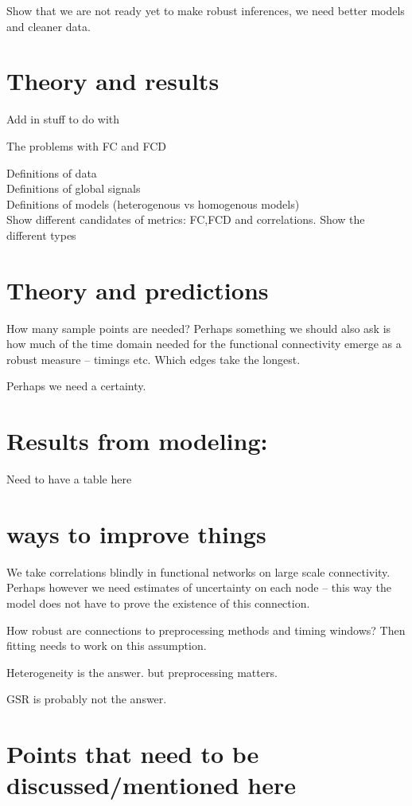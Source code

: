 \documentclass[10pt]{article}
\begin{document}
Show that we are not ready yet to make robust inferences, we need better models and cleaner data.

\section{Theory and results}

Add in stuff to do with 

The problems with FC and FCD

Definitions of data \\
Definitions of global signals \\
Definitions of models (heterogenous vs homogenous models) \\
Show different candidates of metrics: FC,FCD and correlations.
Show the different types \\

\section{Theory and predictions}

How many sample points are needed?
Perhaps something we should also ask is how much of the time domain needed for the functional connectivity emerge as a robust measure -- timings etc. Which edges take the longest.

Perhaps we need a certainty. 

\section{Results from modeling:}
Need to have a table here

\section{ways to improve things}
We take correlations blindly in functional networks on large scale connectivity. Perhaps however we need estimates of uncertainty on each node -- this way the model does not have to prove the existence of this connection. 

How robust are connections to preprocessing methods and timing windows? Then fitting needs to work on this assumption.

Heterogeneity is the answer. but preprocessing matters.

GSR is probably not the answer.

\section{Points that need to be discussed/mentioned here}
\end{document}
